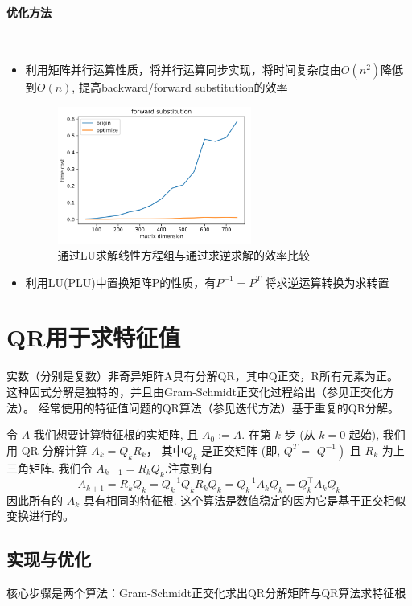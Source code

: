 \documentclass{ctexrep}
\begin{document}
\paragraph*{优化方法}
\\
\begin{itemize}
    \item 利用矩阵并行运算性质，将并行运算同步实现，将时间复杂度由$O(n^2)$降低到$O(n)$, 提高backward/forward substitution的效率
     \begin{figure}[ht]
        \centering
    	\includegraphics[width=180pt]{figures/forward_sub.png}
    	\caption{通过LU求解线性方程组与通过求逆求解的效率比较}
    	\label{fig:forward}
    \end{figure}
    \item 利用LU(PLU)中置换矩阵P的性质，有$P^{-1}=P^{T}$ 将求逆运算转换为求转置
\end{itemize}


\section{QR用于求特征值}
实数（分别是复数）非奇异矩阵A具有分解QR，其中Q正交，R所有元素为正。 这种因式分解是独特的，并且由Gram-Schmidt正交化过程给出（参见正交化方法）。 经常使用的特征值问题的QR算法（参见迭代方法）基于重复的QR分解。\cite{QR_wiki}

令 $A$ 我们想要计算特征根的实矩阵, 且 $A_{0}:=A$. 在第 $k$ 步 (从 $k=0$ 起始), 我们用 $\mathrm{QR}$ 分解计算 $A_{k}=Q_{k} R_{k}$，  其中$Q_{k}$ 是正交矩阵 (即, $Q^{T}=$ $\left.Q^{-1}\right)$ 且 $R_{k}$ 为上三角矩阵. 我们令 $A_{k+1}=R_{k} Q_{k}$.注意到有
$$
A_{k+1}=R_{k} Q_{k}=Q_{k}^{-1} Q_{k} R_{k} Q_{k}=Q_{k}^{-1} A_{k} Q_{k}=Q_{k}^{\top} A_{k} Q_{k}
$$
因此所有的 $A_{k}$ 具有相同的特征根. 这个算法是数值稳定的因为它是基于正交相似变换进行的。
\subsection{实现与优化}

核心步骤是两个算法：Gram-Schmidt正交化求出QR分解矩阵与QR算法求特征根
\end{document}
